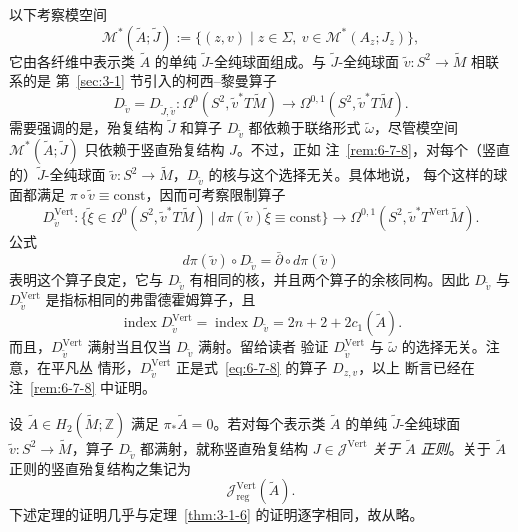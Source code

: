 以下考察模空间
\[
  \mathcal M^*(\widetilde A;\widetilde J)
  :=\bigl\{(z,v)\mid z\in\Sigma,\ v\in\mathcal M^*(A_z;J_z)\bigr\},
\]
它由各纤维中表示类 $\widetilde A$ 的单纯 $\widetilde J$-全纯球面组成。与
$\widetilde J$-全纯球面 $\widetilde v:S^2\to\widetilde M$ 相联系的是
第~\ref{sec:3-1} 节引入的柯西--黎曼算子
\[
  D_{\widetilde v}=D_{\widetilde J,\widetilde v}:
  \Omega^0(S^2,\widetilde v^*T\widetilde M)
  \longrightarrow
  \Omega^{0,1}(S^2,\widetilde v^*T\widetilde M).
\]
需要强调的是，殆复结构 $\widetilde J$ 和算子 $D_{\widetilde v}$ 都依赖于联络形式
$\widetilde\omega$，尽管模空间
$\mathcal M^*(\widetilde A;\widetilde J)$ 只依赖于竖直殆复结构 $J$。不过，正如
注~\ref{rem:6-7-8}，对每个（竖直的）$\widetilde J$-全纯球面
$\widetilde v:S^2\to\widetilde M$，$D_{\widetilde v}$ 的核与这个选择无关。具体地说，
每个这样的球面都满足 $\pi\circ\widetilde v\equiv\mathrm{const}$，因而可考察限制算子
\[
  D_{\widetilde v}^{\mathrm{Vert}}:
  \bigl\{\widetilde\xi\in\Omega^0(S^2,\widetilde v^*T\widetilde M)\mid
  d\pi(\widetilde v)\widetilde\xi\equiv\mathrm{const}\bigr\}
  \longrightarrow
  \Omega^{0,1}(S^2,\widetilde v^*T^{\mathrm{Vert}}\widetilde M).
\]
公式
\[
  d\pi(\widetilde v)\circ D_{\widetilde v}
  =\bar\partial\circ d\pi(\widetilde v)
\]
表明这个算子良定，它与 $D_{\widetilde v}$ 有相同的核，并且两个算子的余核同构。因此
$D_{\widetilde v}$ 与 $D_{\widetilde v}^{\mathrm{Vert}}$ 是指标相同的弗雷德霍姆算子，且
\[
  \operatorname{index}D_{\widetilde v}^{\mathrm{Vert}}
  =\operatorname{index}D_{\widetilde v}
  =2n+2+2c_1(\widetilde A).
\]
而且，$D_{\widetilde v}^{\mathrm{Vert}}$ 满射当且仅当 $D_{\widetilde v}$ 满射。留给读者
验证 $D_{\widetilde v}^{\mathrm{Vert}}$ 与 $\widetilde\omega$ 的选择无关。注意，在平凡丛
情形，$D_{\widetilde v}^{\mathrm{Vert}}$ 正是式~\eqref{eq:6-7-8} 的算子 $D_{z,v}$，以上
断言已经在注~\ref{rem:6-7-8} 中证明。

设 $\widetilde A\in H_2(\widetilde M;\mathbb Z)$ 满足
$\pi_*\widetilde A=0$。若对每个表示类 $\widetilde A$ 的单纯 $\widetilde J$-全纯球面
$\widetilde v:S^2\to\widetilde M$，算子 $D_{\widetilde v}$ 都满射，就称竖直殆复结构
$J\in\mathcal J^{\mathrm{Vert}}$ \emph{关于 $\widetilde A$ 正则}。关于
$\widetilde A$ 正则的竖直殆复结构之集记为
\[
  \mathcal J_{\mathrm{reg}}^{\mathrm{Vert}}(\widetilde A).
\]
下述定理的证明几乎与定理~\ref{thm:3-1-6} 的证明逐字相同，故从略。

